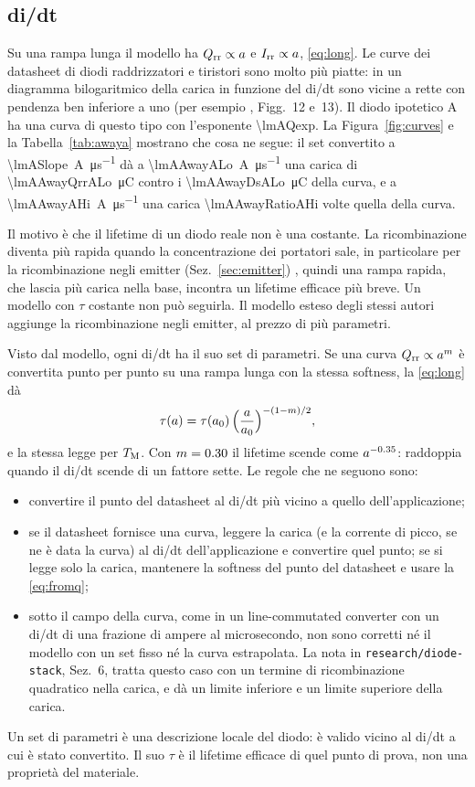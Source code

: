 \documentclass[10pt,a4paper]{scrartcl}
\let\newcommand\pdvaluedefine
\newcommand{\Irr}{I_\mathrm{rr}}
\newcommand{\Qrr}{Q_\mathrm{rr}}
\newcommand{\TM}{T_\mathrm{M}}
\begin{document}
\subsection{di/dt}
\label{sec:slope}
Su una rampa lunga il modello ha $\Qrr \propto a$ e $\Irr \propto a$, \eqref{eq:long}. Le curve dei datasheet di diodi raddrizzatori e tiristori sono molto più piatte: in un diagramma bilogaritmico della carica in funzione del di/dt sono vicine a rette con pendenza ben inferiore a uno (per esempio \cite{an5950}, Figg.~12 e~13). Il diodo ipotetico A ha una curva di questo tipo con l'esponente \num{\lmAQexp}. La Figura~\ref{fig:curves} e la Tabella~\ref{tab:awaya} mostrano che cosa ne segue: il set convertito a \SI{\lmASlope}{\ampere\per\micro\second} dà a \SI{\lmAAwayALo}{\ampere\per\micro\second} una carica di \SI{\lmAAwayQrrALo}{\micro\coulomb} contro i \SI{\lmAAwayDsALo}{\micro\coulomb} della curva, e a \SI{\lmAAwayAHi}{\ampere\per\micro\second} una carica \num{\lmAAwayRatioAHi} volte quella della curva.

Il motivo è che il lifetime di un diodo reale non è una costante. La ricombinazione diventa più rapida quando la concentrazione dei portatori sale, in particolare per la ricombinazione negli emitter (Sez.~\ref{sec:emitter}) \cite{schlangenotto1969}, quindi una rampa rapida, che lascia più carica nella base, incontra un lifetime efficace più breve. Un modello con $\tau$ costante non può seguirla. Il modello esteso degli stessi autori \cite{ma1993} aggiunge la ricombinazione negli emitter, al prezzo di più parametri.

Visto dal modello, ogni di/dt ha il suo set di parametri. Se una curva $\Qrr \propto a^{m}$ è convertita punto per punto su una rampa lunga con la stessa softness, la \eqref{eq:long} dà
\begin{equation}
\tau(a) = \tau(a_0)\,\Bigl(\frac{a}{a_0}\Bigr)^{-(1-m)/2} ,
\label{eq:taucurve}
\end{equation}
e la stessa legge per $\TM$. Con $m = 0.30$ il lifetime scende come $a^{-0.35}$: raddoppia quando il di/dt scende di un fattore sette. Le regole che ne seguono sono:
\begin{itemize}
\item convertire il punto del datasheet al di/dt più vicino a quello dell'applicazione;
\item se il datasheet fornisce una curva, leggere la carica (e la corrente di picco, se ne è data la curva) al di/dt dell'applicazione e convertire quel punto; se si legge solo la carica, mantenere la softness del punto del datasheet e usare la \eqref{eq:fromq};
\item sotto il campo della curva, come in un line-commutated converter con un di/dt di una frazione di ampere al microsecondo, non sono corretti né il modello con un set fisso né la curva estrapolata. La nota in \texttt{research/diode-stack}, Sez.~6, tratta questo caso con un termine di ricombinazione quadratico nella carica, e dà un limite inferiore e un limite superiore della carica.
\end{itemize}
Un set di parametri è una descrizione locale del diodo: è valido vicino al di/dt a cui è stato convertito. Il suo $\tau$ è il lifetime efficace di quel punto di prova, non una proprietà del materiale.
\end{document}
